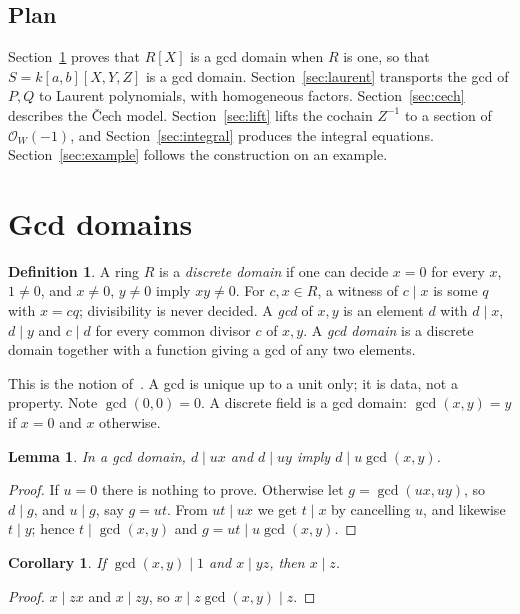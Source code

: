 \documentclass[11pt]{amsart}
\newtheorem{lemma}[theorem]{Lemma}
\newtheorem{corollary}[theorem]{Corollary}
\theoremstyle{definition}
\newtheorem{definition}[theorem]{Definition}
\theoremstyle{remark}
\newcommand{\gcdop}{\operatorname{gcd}}
\begin{document}
\subsection*{Plan}
Section~\ref{sec:gcd} proves that $R[X]$ is a gcd domain when $R$ is one,
so that $S=k[a,b][X,Y,Z]$ is a gcd domain.
Section~\ref{sec:laurent} transports the gcd of $P,Q$ to Laurent
polynomials, with homogeneous factors.
Section~\ref{sec:cech} describes the \v{C}ech model.
Section~\ref{sec:lift} lifts the cochain $Z^{-1}$ to a section of
$\mathcal O_W(-1)$, and Section~\ref{sec:integral} produces the integral
equations. Section~\ref{sec:example} follows the construction on an
example.

\section{Gcd domains}\label{sec:gcd}

\begin{definition}
A ring $R$ is a \emph{discrete domain} if one can decide $x=0$ for every
$x$, $1\ne0$, and $x\ne0$, $y\ne0$ imply $xy\ne0$.
For $c,x\in R$, a witness of $c\mid x$ is some $q$ with $x=cq$; divisibility
is never decided. A \emph{gcd} of $x,y$ is an element $d$ with $d\mid x$,
$d\mid y$ and $c\mid d$ for every common divisor $c$ of $x,y$. A \emph{gcd
domain} is a discrete domain together with a function giving a gcd of any
two elements.
\end{definition}

This is the notion of~\cite{MRR}. A gcd is unique up to a unit only; it is data, not a property. Note
$\gcdop(0,0)=0$. A discrete field is a gcd domain: $\gcdop(x,y)=y$ if
$x=0$ and $x$ otherwise.

\begin{lemma}\label{lem:M}
In a gcd domain, $d\mid ux$ and $d\mid uy$ imply $d\mid u\gcdop(x,y)$.
\end{lemma}
\begin{proof}
If $u=0$ there is nothing to prove. Otherwise let $g=\gcdop(ux,uy)$, so
$d\mid g$, and $u\mid g$, say $g=ut$. From $ut\mid ux$ we get $t\mid x$ by
cancelling $u$, and likewise $t\mid y$; hence $t\mid\gcdop(x,y)$ and
$g=ut\mid u\gcdop(x,y)$.
\end{proof}

\begin{corollary}\label{cor:euclid}
If $\gcdop(x,y)\mid1$ and $x\mid yz$, then $x\mid z$.
\end{corollary}
\begin{proof}
$x\mid zx$ and $x\mid zy$, so $x\mid z\gcdop(x,y)\mid z$.
\end{proof}
\end{document}
